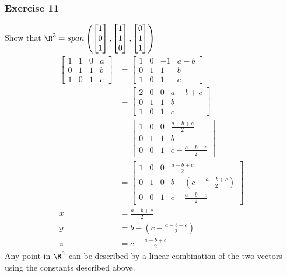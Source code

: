 \documentclass{math}
\begin{document}
\subsubsection*{Exercise 11}
Show that \( \R^3 = span\left(\begin{bmatrix}1 \\ 0 \\ 1\end{bmatrix},
\begin{bmatrix}1 \\ 1 \\0\end{bmatrix},\begin{bmatrix}0 \\ 1 \\ 1\end{bmatrix}
\right) \)
\begin{align*}
  \begin{bmatrix}
    1 & 1 & 0 & a \\
    0 & 1 & 1 & b \\
    1 & 0 & 1 & c
  \end{bmatrix} &= \begin{bmatrix}
    1 & 0 & -1 & a-b \\
    0 & 1 & 1 & b \\
    1 & 0 & 1 & c
  \end{bmatrix} \\
  &= \begin{bmatrix}
    2 & 0 & 0 & a-b+c \\
    0 & 1 & 1 & b \\
    1 & 0 & 1 & c
  \end{bmatrix} \\
  &= \begin{bmatrix}
    1 & 0 & 0 & \frac{a-b+c}{2} \\
    0 & 1 & 1 & b \\
    0 & 0 & 1 & c-\frac{a-b+c}{2}
  \end{bmatrix} \\
  &= \begin{bmatrix}
    1 & 0 & 0 & \frac{a-b+c}{2} \\
    0 & 1 & 0 & b-(c-\frac{a-b+c}{2}) \\
    0 & 0 & 1 & c-\frac{a-b+c}{2}
  \end{bmatrix} \\
  x &= \frac{a-b+c}{2} \\
  y &= b-(c-\frac{a-b+c}{2}) \\
  z &= c-\frac{a-b+c}{2}
\end{align*}
Any point in \( \R^3 \) can be described by a linear combination of the two
vectors using the constants described above.
\end{document}
